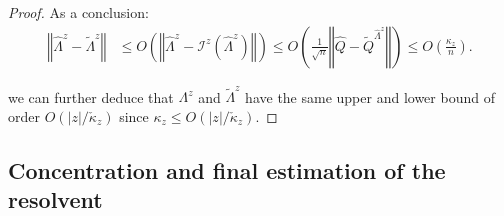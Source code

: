 \documentclass[a4papaer, titlepage]{book}
\begin{document}
\begin{proof}
       As a conclusion:
       \begin{align*}
         \left\Vert\hat \Lambda^z - \tilde \Lambda^z \right\Vert 
         &\leq  O \left(\left\Vert \hat \Lambda^z - \mathcal I^z(\hat \Lambda^z)\right\Vert \right)
         \leq O \left(\frac{1}{\sqrt n} \left\Vert \hat Q - \tilde Q^{\hat \Lambda^z}\right\Vert\right) \leq O \left(\frac{\kappa_z}{n}\right).
       \end{align*}

      we can further deduce that $ \Lambda^z$ and $\tilde \Lambda^z$ have the same upper and lower bound of order $O(|z|/\check \kappa_z)$ since $\kappa_z \leq O(|z|/\check \kappa_z)$.
  \end{proof}


\subsection{Concentration and final estimation of the resolvent}
\end{document}
